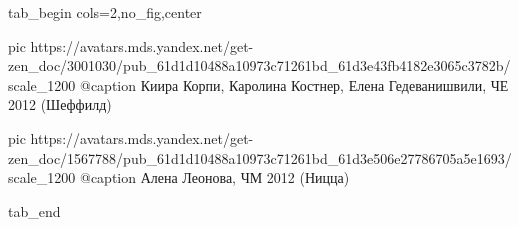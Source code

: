  
 
 
 
 


\ifcmt
  tab_begin cols=2,no_fig,center

     pic https://avatars.mds.yandex.net/get-zen_doc/3001030/pub_61d1d10488a10973c71261bd_61d3e43fb4182e3065c3782b/scale_1200
		 @caption Киира Корпи, Каролина Костнер, Елена Гедеванишвили, ЧЕ 2012 (Шеффилд)

		 pic https://avatars.mds.yandex.net/get-zen_doc/1567788/pub_61d1d10488a10973c71261bd_61d3e506e27786705a5e1693/scale_1200
		 @caption Алена Леонова, ЧМ 2012 (Ницца)

  tab_end
\fi

